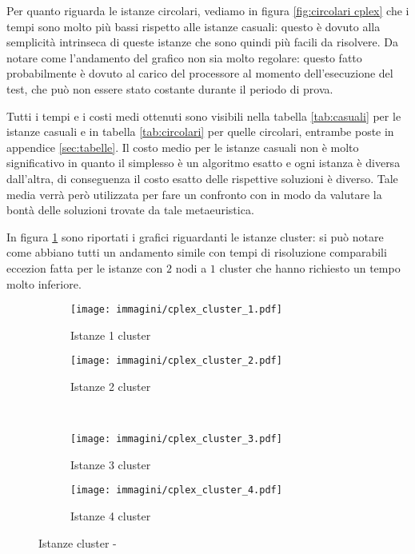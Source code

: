 Per quanto riguarda le istanze circolari, vediamo in figura \ref{fig:circolari cplex} che i tempi sono molto più bassi rispetto alle istanze casuali: questo è dovuto alla semplicità intrinseca di queste istanze che sono quindi più facili da risolvere.
Da notare come l'andamento del grafico non sia molto regolare: questo fatto probabilmente è dovuto al carico del processore al momento dell'esecuzione del test, che può non essere stato costante durante il periodo di prova.

Tutti i tempi e i costi medi ottenuti sono visibili nella tabella \ref{tab:casuali} per le istanze casuali e in tabella \ref{tab:circolari} per quelle circolari, entrambe poste in appendice \ref{sec:tabelle}.
Il costo medio per le istanze casuali non è molto significativo in quanto il simplesso è un algoritmo esatto e ogni istanza è diversa dall'altra, di conseguenza il costo esatto delle rispettive soluzioni è diverso.
Tale media verrà però utilizzata per fare un confronto con \tabu in modo da valutare la bontà delle soluzioni trovate da tale metaeuristica.

In figura \ref{fig:cluster cplex} sono riportati i grafici riguardanti le istanze cluster: si può notare come abbiano tutti un andamento simile con tempi di risoluzione comparabili eccezion fatta per le istanze con $2$ nodi a $1$ cluster che hanno richiesto un tempo molto inferiore.

\begin{figure}[htb]
	\centering
	\begin{subfigure}[b]{.45\textwidth}
		\texttt{[image: immagini/cplex\_cluster\_1.pdf]}
		\caption{Istanze 1 cluster}
	\end{subfigure}
	\quad
	\begin{subfigure}[b]{.45\textwidth}
		\texttt{[image: immagini/cplex\_cluster\_2.pdf]}
		\caption{Istanze 2 cluster}
	\end{subfigure}
	\\
	\begin{subfigure}[b]{.45\textwidth}
		\texttt{[image: immagini/cplex\_cluster\_3.pdf]}
		\caption{Istanze 3 cluster}
	\end{subfigure}
	\quad
	\begin{subfigure}[b]{.45\textwidth}
		\texttt{[image: immagini/cplex\_cluster\_4.pdf]}
		\caption{Istanze 4 cluster}
	\end{subfigure}
	\caption{Istanze cluster - }
	\label{fig:cluster cplex}
\end{figure}

